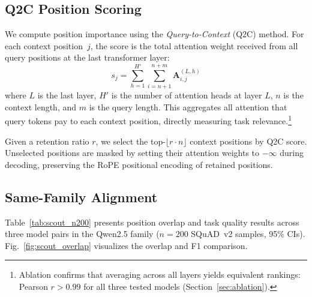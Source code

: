 \documentclass[journal]{IEEEtran}
\newcommand{\QtoC}{\textsc{Q2C}\xspace}
\newcommand{\bA}{\mathbf{A}}
\begin{document}
\subsection{Q2C Position Scoring}

We compute position importance using the \emph{Query-to-Context} (\QtoC) method.
For each context position~$j$, the score is the total attention weight received from all query positions at the last transformer layer:
\begin{equation}
    s_j = \sum_{h=1}^{H'} \sum_{i=n+1}^{n+m} \bA^{(L,h)}_{i,j}
    \label{eq:q2c_score}
\end{equation}
where $L$ is the last layer, $H'$ is the number of attention heads at layer $L$, $n$ is the context length, and $m$ is the query length.
This aggregates all attention that query tokens pay to each context position, directly measuring task relevance.\footnote{Ablation confirms that averaging across all layers yields equivalent rankings: Pearson $r > 0.99$ for all three tested models (Section~\ref{sec:ablation}).}

Given a retention ratio $r$, we select the top-$\lfloor r \cdot n \rfloor$ context positions by \QtoC score.
Unselected positions are masked by setting their attention weights to $-\infty$ during decoding, preserving the RoPE positional encoding of retained positions.

\subsection{Same-Family Alignment}

Table~\ref{tab:scout_n200} presents position overlap and task quality results across three model pairs in the Qwen2.5 family ($n = 200$ SQuAD~v2 samples, 95\% CIs).
Fig.~\ref{fig:scout_overlap} visualizes the overlap and F1 comparison.
\end{document}
